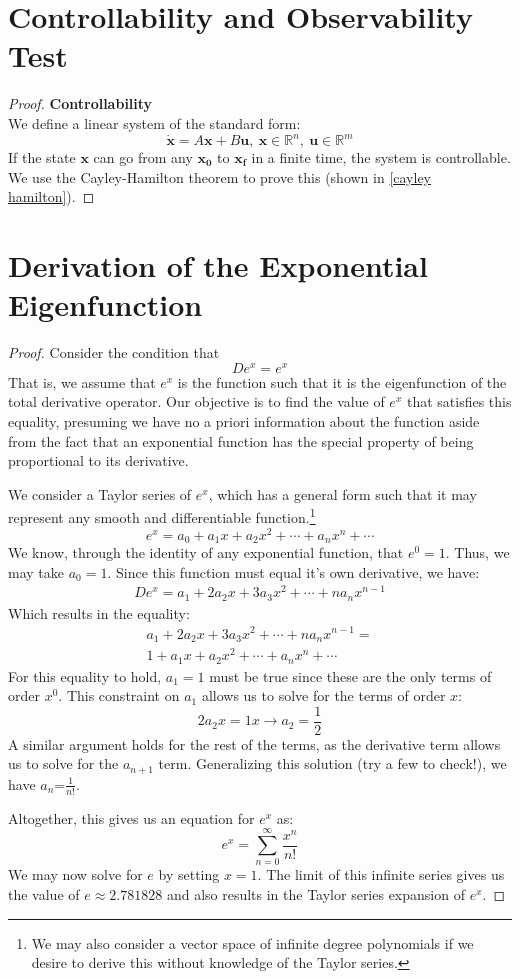 \section{Controllability and Observability Test}
\begin{proof}\label{Controllability proof} \textbf{Controllability}\\
We define a linear system of the standard form:
$$\mathbf{\dot{x}}=A\textbf{x}+B\textbf{u}, \ \textbf{x}\in\mathbb{R}^n,\ \textbf{u}\in\mathbb{R}^m$$
If the state $\textbf{x}$ can go from any $\mathbf{x_0}$ to $\mathbf{x_f}$ in a finite time, the system is controllable. We use the Cayley-Hamilton theorem to prove this (shown in \autoref{cayley hamilton}).

\end{proof}

\section{Derivation of the Exponential Eigenfunction}\label{sec:derivation of exp}
\begin{proof}
Consider the condition that 
$$De^{x}=e^{x}$$
That is, we assume that $e^x$ is the function such that it is the eigenfunction of the total derivative operator. Our objective is to find the value of $e^x$ that satisfies this equality, presuming we have no a priori information about the function aside from the fact that an exponential function has the special property of being proportional to its derivative.

We consider a Taylor series of $e^x$, which has a general form such that it may represent any smooth and differentiable function.\footnote{We may also consider a vector space of infinite degree polynomials if we desire to derive this without knowledge of the Taylor series.}
$$e^x=a_0+a_1x+a_2x^2+\cdots+ a_nx^n+\cdots$$
We know, through the identity of any exponential function, that $e^0=1$. Thus, we may take $a_0=1$. Since this function must equal it's own derivative, we have:
\begin{gather}
    De^x=a_1+2a_2x+3a_3x^2+\cdots +na_nx^{n-1}
\end{gather}
Which results in the equality:
\begin{gather}
    a_1+2a_2x+3a_3x^2+\cdots +na_nx^{n-1}=\\
    1+a_1x+a_2x^2+\cdots+ a_nx^n+\cdots
\end{gather}
For this equality to hold, $a_1=1$ must be true since these are the only terms of order $x^0$. This constraint on $a_1$ allows us to solve for the terms of order $x$:
$$2a_2x=1x\rightarrow a_2=\frac{1}{2}$$
A similar argument holds for the rest of the terms, as the derivative term allows us to solve for the $a_{n+1}$  term. Generalizing this solution (try a few to check!), we have $a_n$=$\frac{1}{n!}$.

Altogether, this gives us an equation for $e^x$ as:
$$e^x=\sum_{n=0}^\infty\frac{x^n}{n!}$$
We may now solve for $e$ by setting $x=1$. The limit of this infinite series gives us the value of $e\approx2.781828$ and also results in the Taylor series expansion of $e^x$.

\end{proof}

